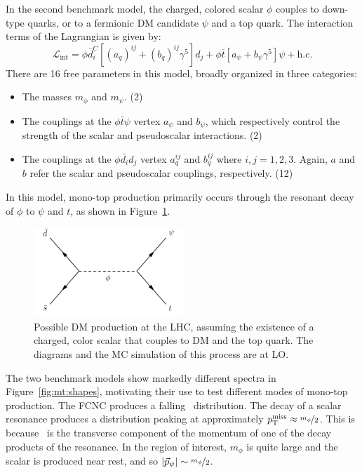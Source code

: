In the second benchmark model, the charged, colored scalar $\phi$ couples to down-type quarks, or to a fermionic DM candidate $\psi$ and a top quark.
The interaction terms of the Lagrangian is given by:
\begin{equation}
    \mathcal{L}_\text{int} = \phi\overline{{d}}_i^C[(a_{q})^{ij}+(b_{q})^{ij}\gamma^5]{d}_j+\phi\overline{{t}}[a_{\psi}+b_{\psi}\gamma^5]\psi+\text{h.c.}
\end{equation}
There are 16 free parameters in this model, broadly organized in three categories:
\begin{itemize}
    \item The masses $m_\phi$ and $m_\psi$. (2)
    \item The couplings at the $\phi \bar{t} \psi$ vertex $a_\psi$ and $b_\psi$, which respectively control the strength of the scalar and pseudoscalar interactions. (2)
    \item The couplings at the $\phi \bar{d_i} d_j$ vertex $a_q^{ij}$ and $b_q^{ij}$ where $i,j=1,2,3$. Again, $a$ and $b$ refer the scalar and pseudoscalar couplings, respectively. (12)
\end{itemize}
In this model, mono-top production primarily occurs through the resonant decay of $\phi$ to $\psi$ and $t$, as shown in Figure~\ref{fig:mt:resdiag}.

\begin{figure}[]
    \begin{center}
        \includegraphics[width=0.5\textwidth]{figures/monotop/diagrams/resonant.pdf}
        \caption{Possible DM production at the LHC, assuming the existence of a charged, color scalar that couples to DM and the top quark.
                 The diagrams and the MC simulation of this process are at LO.}
        \label{fig:mt:resdiag}
    \end{center}
\end{figure}

The two benchmark models show markedly different spectra in Figure~\ref{fig:mt:shapes}, motivating their use to test different modes of mono-top production.
The FCNC produces a falling \ptmiss~distribution.
The decay of a scalar resonance produces a distribution peaking at approximately $p_\mathrm{T}^\mathrm{miss}\approx\nicefrac{m_\phi}{2}$.
This is because \ptmiss~is the transverse component of the momentum of one of the decay products of the resonance.
In the region of interest, $m_\phi$ is quite large and the scalar is produced near rest, and so $|\vec p_\psi| \sim \nicefrac{m_\phi}{2}$.

